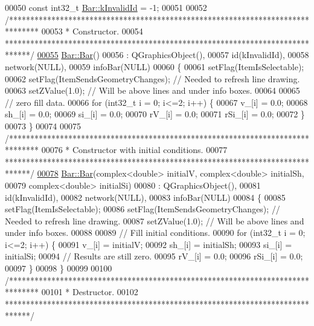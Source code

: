 \begin{DoxyCode}
00050 \textcolor{keyword}{const} int32\_t \hyperlink{group___models_ga9919592c0397ed41448dfb20b607d738}{Bar::kInvalidId} = -1;
00051 
00052 \textcolor{comment}{/*******************************************************************************}
00053 \textcolor{comment}{ * Constructor.}
00054 \textcolor{comment}{ ******************************************************************************/}
\hypertarget{bar_8cpp_source_l00055}{}\hyperlink{group___models_ga9cae2188fcc6cce41caa7898c64548d1}{00055} \hyperlink{group___models_ga9cae2188fcc6cce41caa7898c64548d1}{Bar::Bar}()
00056   : QGraphicsObject(),
00057     id(kInvalidId),
00058     network(NULL),
00059     infoBar(NULL)
00060 \{
00061   setFlag(ItemIsSelectable);
00062   setFlag(ItemSendsGeometryChanges); \textcolor{comment}{// Needed to refresh line drawing.}
00063   setZValue(1.0); \textcolor{comment}{// Will be above lines and under info boxes.}
00064 
00065   \textcolor{comment}{// zero fill data.}
00066   \textcolor{keywordflow}{for} (int32\_t i = 0; i<=2; i++) \{
00067     v\_[i] = 0.0;
00068     sh\_[i] = 0.0;
00069     si\_[i] = 0.0;
00070     rV\_[i] = 0.0;
00071     rSi\_[i] = 0.0;
00072   \}
00073 \}
00074 
00075 \textcolor{comment}{/*******************************************************************************}
00076 \textcolor{comment}{ * Constructor with initial conditions.}
00077 \textcolor{comment}{ ******************************************************************************/}
\hypertarget{bar_8cpp_source_l00078}{}\hyperlink{group___models_gab1c5a81ad40dbc7ee745077b4f5c20d4}{00078} \hyperlink{group___models_ga9cae2188fcc6cce41caa7898c64548d1}{Bar::Bar}(complex<double> initialV, complex<double> initialSh,
00079          complex<double> initialSi)
00080   : QGraphicsObject(),
00081     id(kInvalidId),
00082     network(NULL),
00083     infoBar(NULL)
00084 \{
00085   setFlag(ItemIsSelectable);
00086   setFlag(ItemSendsGeometryChanges); \textcolor{comment}{// Needed to refresh line drawing.}
00087   setZValue(1.0); \textcolor{comment}{// Will be above lines and under info boxes.}
00088 
00089   \textcolor{comment}{// Fill initial conditions.}
00090   \textcolor{keywordflow}{for} (int32\_t i = 0; i<=2; i++) \{
00091     v\_[i] = initialV;
00092     sh\_[i] = initialSh;
00093     si\_[i] = initialSi;
00094     \textcolor{comment}{// Results are still zero.}
00095     rV\_[i] = 0.0;
00096     rSi\_[i] = 0.0;
00097   \}
00098 \}
00099 
00100 \textcolor{comment}{/*******************************************************************************}
00101 \textcolor{comment}{ * Destructor.}
00102 \textcolor{comment}{ ******************************************************************************/}

\end{DoxyCode}
